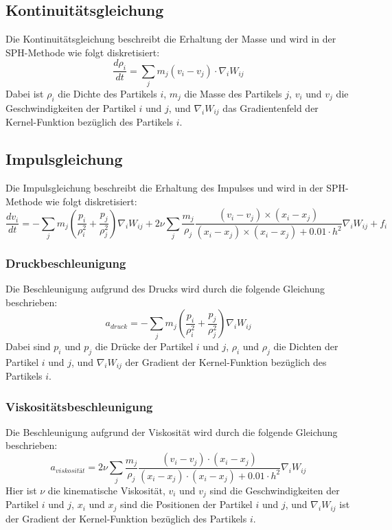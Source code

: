 \documentclass[a4paper, 12pt]{article}
\begin{document}
\subsection{Kontinuitätsgleichung}
Die Kontinuitätsgleichung beschreibt die Erhaltung der Masse und wird in der SPH-Methode wie folgt diskretisiert:
\[
\frac{d\rho_i}{dt} = \sum_j m_j (v_i - v_j) \cdot \nabla_i W_{ij}
\]
Dabei ist \(\rho_i\) die Dichte des Partikels \(i\), \(m_j\) die Masse des Partikels \(j\), \(v_i\) und \(v_j\) die Geschwindigkeiten der Partikel \(i\) und \(j\), und \(\nabla_i W_{ij}\) das Gradientenfeld der Kernel-Funktion bezüglich des Partikels \(i\).

\subsection{Impulsgleichung}
Die Impulsgleichung beschreibt die Erhaltung des Impulses und wird in der SPH-Methode wie folgt diskretisiert:
\[
\frac{d v_i}{dt} = -\sum_j m_j \left( \frac{p_i}{\rho_i^2} + \frac{p_j}{\rho_j^2} \right) \nabla_i W_{ij} + 2 \nu \sum_j \frac{m_j}{\rho_j} \frac{(v_i - v_j) \times (x_i - x_j)}{(x_i - x_j) \times (x_i - x_j) + 0.01\cdot h^2} \nabla_i W_{ij} + f_i
\]

\subsubsection{Druckbeschleunigung}
Die Beschleunigung aufgrund des Drucks wird durch die folgende Gleichung beschrieben:
\begin{equation} \label{equ:druckBesch}
	a_{druck} = -\sum_j m_j \left( \frac{p_i}{\rho_i^2} + \frac{p_j}{\rho_j^2} \right) \nabla_i W_{ij}
\end{equation}
Dabei sind \( p_i \) und \( p_j \) die Drücke der Partikel \( i \) und \( j \), \(\rho_i \) und \(\rho_j \) die Dichten der Partikel \( i \) und \( j \), und \( \nabla_i W_{ij} \) der Gradient der Kernel-Funktion bezüglich des Partikels \( i \).

\subsubsection{Viskositätsbeschleunigung}
Die Beschleunigung aufgrund der Viskosität wird durch die folgende Gleichung beschrieben:
\begin{equation} \label{equ:viskositätBesch}
	a_{viskosität} = 2 \nu \sum_j \frac{m_j}{\rho_j} \frac{(v_i - v_j) \cdot (x_i - x_j)}{(x_i - x_j) \cdot (x_i - x_j) + 0.01\cdot h^2} \nabla_i W_{ij}
\end{equation}
Hier ist \(\nu\) die kinematische Viskosität, \( v_i \) und \( v_j \) sind die Geschwindigkeiten der Partikel \( i \) und \( j \), \( x_i \) und \( x_j \) sind die Positionen der Partikel \( i \) und \( j \), und \(\nabla_i W_{ij}\) ist der Gradient der Kernel-Funktion bezüglich des Partikels \( i \).
\end{document}
